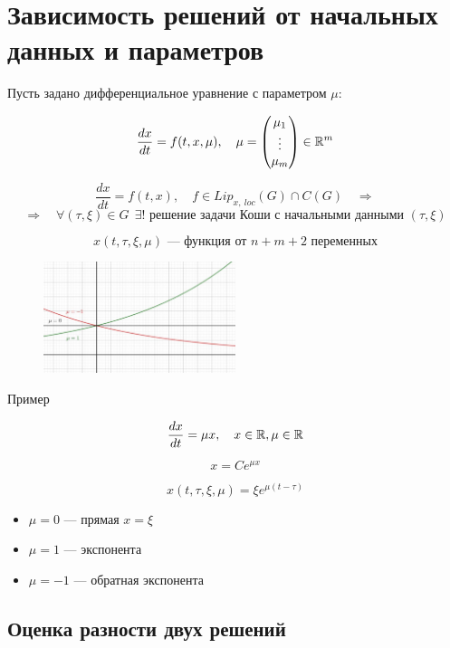 \newpage

\section{Зависимость решений от начальных данных и параметров}

Пусть задано дифференциальное уравнение с параметром $\mu$:

$$\frac{dx}{dt} = f(t, x, \mu), \quad \mu = \begin{pmatrix}
  \mu_1 \\
  \vdots \\
  \mu_m
\end{pmatrix} \in \mathbb{R}^m$$

$$\frac{dx}{dt} = f(t, x), \quad f\in Lip_{x,\ loc}(G) \cap C(G) \quad \Rightarrow$$
$$\Rightarrow \quad \forall (\tau, \xi) \in G\ \ \exists!
\text{ решение задачи Коши с начальными данными } (\tau, \xi)$$

$$x(t, \tau, \xi, \mu) \text{ --- функция от $n+m+2$ переменных}$$


\begin{figure}
\includegraphics[width = 0.5\textwidth]{images/mu.JPG}
\end{figure}

Пример

$$\frac{dx}{dt} = \mu x, \quad x \in \mathbb{R}, \mu \in \mathbb{R}$$

$$x = Ce^{\mu x}$$

$$x(t, \tau, \xi, \mu) = \xi e^{\mu (t - \tau)}$$

\begin{itemize}
  \item $\mu = 0$ --- прямая $x = \xi$
  \item $\mu = 1$ --- экспонента
  \item $\mu = -1$ --- обратная экспонента
\end{itemize}


\vspace{10mm}
\subsection{Оценка разности двух решений}

